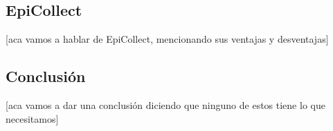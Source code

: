 \subsection{EpiCollect}
[aca vamos a hablar de EpiCollect, mencionando sus ventajas y desventajas]

\subsection{Conclusión}
[aca vamos a dar una conclusión diciendo que ninguno de estos tiene lo que necesitamos]

